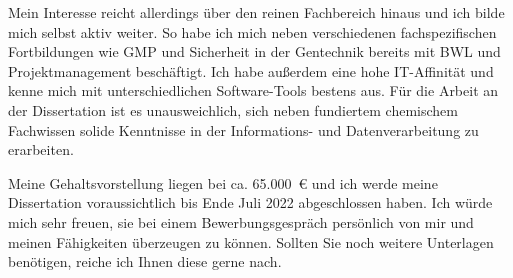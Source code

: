 Mein Interesse reicht allerdings über den reinen Fachbereich hinaus und ich bilde mich selbst aktiv weiter. So habe ich mich neben verschiedenen fachspezifischen Fortbildungen wie GMP und Sicherheit in der Gentechnik bereits mit BWL und Projektmanagement beschäftigt. Ich habe außerdem eine hohe IT-Affinität und kenne mich mit unterschiedlichen Software-Tools bestens aus. Für die Arbeit an der Dissertation ist es unausweichlich, sich neben fundiertem chemischem Fachwissen solide Kenntnisse in der Informations- und Datenverarbeitung zu erarbeiten.\par %

Meine Gehaltsvorstellung liegen bei ca. 65.000~\euro{} und ich werde meine Dissertation voraussichtlich bis Ende Juli 2022 abgeschlossen haben. Ich würde mich sehr freuen, sie bei einem Bewerbungsgespräch persönlich von mir und meinen Fähigkeiten überzeugen zu können. Sollten Sie noch weitere Unterlagen benötigen, reiche ich Ihnen diese gerne nach.\par\vspace{1em}



\makeletterclosing



